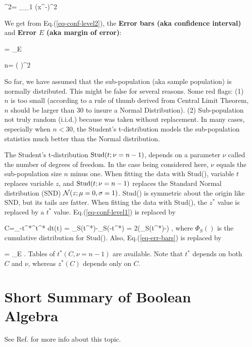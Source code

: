 \beq
\hat{\s}^2=
\sum_{\s\in \Sigma_1} (x^\s-)^2
\eeq


We get
from Eq.(\ref{eq-conf-level2}),
the {\bf Error bars (aka confidence interval)}
and 
{\bf Error $E$ (aka margin of error)}:



\beq
{} =
 \pm 
{}_{E}
\label{eq-err-bars}
\eeq

\beq
n= \left(
\right)^2
\eeq

So far, we have assumed
that the sub-population (aka sample
population)
is normally distributed.
This might be false
for several reasons.
Some red flags: (1)
$n$ is too small (according to
a rule of thumb derived from
Central Limit Theorem, $n$
should be larger than 30
to insure a Normal Distribution).
(2) Sub-population not truly random 
(i.i.d.) 
because was taken
without replacement.
In many cases,
especially
when $n<30$,
the Student's t-distribution
models the sub-population statistics
much
better than the Normal distribution.


The {\rm Student's t-distribution } ${\rm Stud}(t;
\nu=n-1)$,
depends
on a parameter $\nu$
called the
number of
degrees of freedom.
In the case being considered here,
$\nu$ equals the 
sub-population size $n$
minus one.
When fitting
the data with
Stud(), variable
$t$ replaces
variable $z$,
and ${\rm Stud}(t; \nu=n-1)$
replaces the Standard Normal distribution (SND) 
${\cal N}(z; \mu=0, \sigma=1)$.
Stud() is symmetric about
the origin like SND,
but its tails
are fatter.
When fitting the data with Stud(),
the $z^*$
value is replaced 
by a $t^*$ value.
Eq.(\ref{eq-conf-level1})
is replaced by


\beq
C=\int_{-t^*}^{t^*} dt(t) = 
\Phi_S(t^*)-\Phi_S(-t^*)
=
2\left(\Phi_S(t^*)-\right)
\label{eq-conf-level1-stu}
\;,
\eeq
where $\Phi_S()$
is the cumulative
distribution for  Stud().
Also, Eq.(\ref{eq-err-bars})
is replaced  by

\beq
{} =
 \pm 
{}_{E}
\;.
\eeq
Tables of $t^*(C,\nu=n-1)$
are available. Note 
that $t^*$
depends on both $C$ and $\nu$,
whereas $z^*(C)$
depends only on $C$.


\section{Short Summary of 
Boolean Algebra} 
See Ref.\cite{wiki-bool} for more info
about this topic.

